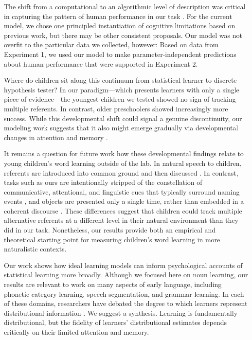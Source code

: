 \documentclass{pnastwo}
\begin{document}
\begin{article}
The shift from a computational to an algorithmic level of description was critical in capturing the pattern of human performance in our task \cite{Marr1982,Frank2010a,Yurovsky2012c}. For the current model, we chose one principled instantiation of cognitive limitations based on previous work, but there may be other consistent proposals. Our model was not overfit to the particular data we collected, however: Based on data from Experiment 1, we used our model to make parameter-independent predictions about human performance that were supported in Experiment 2.

Where do children sit along this continuum from statistical learner to discrete hypothesis tester? In our paradigm---which presents learners with only a single piece of evidence---the youngest children we tested showed no sign of tracking multiple referents. In contrast, older preschoolers showed increasingly more success. While this developmental shift could signal a genuine discontinuity, our modeling work suggests that it also might emerge gradually via developmental changes in attention and memory \cite{Yu2011a,Vlach2013}.

It remains a question for future work how these developmental findings relate to young children's word learning outside of the lab. In natural speech to children, referents are introduced into common ground and then discussed \cite{Clark2003}. In contrast, tasks such as ours are intentionally stripped of the constellation of communicative, attentional, and linguistic cues that typically surround naming events \cite{Frank2013a, Gogate2010, Mintz2003}, and objects are presented only a single time, rather than embedded in a coherent discourse \cite{Frank2013a, Rohde2013}. These differences suggest that children could track multiple alternative referents at a different level in their natural environment than they did in our task. Nonetheless, our results provide both an empirical and theoretical starting point for measuring children's word learning in more naturalistic contexts.

Our work shows how ideal learning models can inform psychological accounts of statistical learning more broadly. Although we focused here on noun learning, our results are relevant to work on many aspects of early language, including phonetic category learning, speech segmentation, and grammar learning. In each of these domains, researchers have debated the degree to which learners represent distributional information \cite{Endress2005, Frank2010a, McMurray2013}. We suggest a synthesis. Learning is fundamentally distributional, but the fidelity of learners' distributional estimates depends critically on their limited attention and memory.


\end{article}
\end{document}
